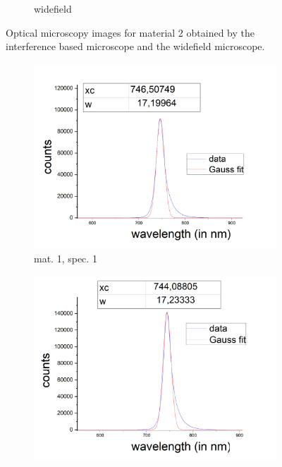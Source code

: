 \begin{figure}[H]
\begin{subfigure}{0.49\textwidth}
        \caption{widefield}
	      \label{fig_mono_spec3_wide}
    \end{subfigure}
    \caption{Optical microscopy images for material 2 obtained by the interference based microscope and the widefield microscope.}
	\label{fig_mono_spec3} %
\end{figure}

\begin{figure}[H]
    \centering
    \begin{subfigure}{0.47\textwidth}
        \centering
        \includegraphics[width=\textwidth]{img/output_t1/spekt_m1-3}
        \caption{mat. 1, spec. 1}
	      \label{fig_mono_spec1_1dspec}
    \end{subfigure}
    \begin{subfigure}{0.47\textwidth}
        \centering
        \includegraphics[width=\textwidth]{img/output_t1/spekt_m1-2-1}

\end{subfigure}
\end{figure}
